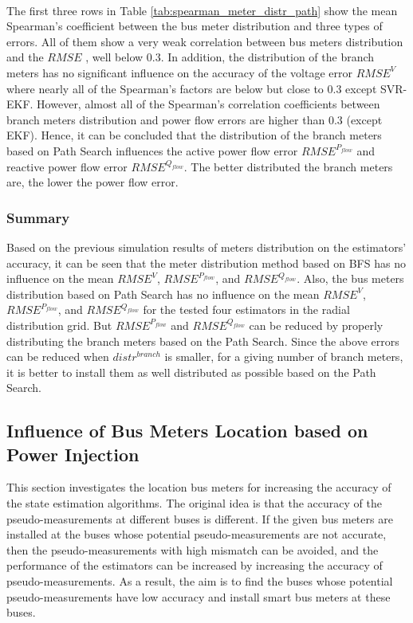 \bigskip
\\The first three rows in Table \ref{tab:spearman_meter_distr_path} show the mean Spearman's coefficient between the bus meter distribution and three types of errors. All of them show a very weak correlation between bus meters distribution and the $RMSE$ , well below 0.3. In addition, the distribution of the branch meters has no significant influence on the accuracy of the voltage error $RMSE^V$ where nearly all of the Spearman's factors are below but close to 0.3 except SVR-EKF. However, almost all of the Spearman's correlation coefficients between branch meters distribution and power flow errors are higher than 0.3 (except EKF). Hence, it can be concluded that the distribution of the branch meters based on Path Search influences the active power flow error $RMSE^{P_{flow}}$ and reactive power flow error $RMSE^{Q_{flow}}$. The better distributed the branch meters are, the lower the power flow error.

\subsubsection{Summary}
Based on the previous simulation results of meters distribution on the estimators' accuracy, it can be seen that the meter distribution method based on BFS has no influence on the mean $RMSE^V$, $RMSE^{P_{flow}}$, and $RMSE^{Q_{flow}}$. Also, the bus meters distribution based on Path Search has no influence on the mean $RMSE^V$, $RMSE^{P_{flow}}$, and $RMSE^{Q_{flow}}$ for the tested four estimators in the radial distribution grid. But $RMSE^{P_{flow}}$ and $RMSE^{Q_{flow}}$ can be reduced by properly distributing the branch meters based on the Path Search. Since the above errors can be reduced when $distr^{branch}$ is smaller, for a giving number of branch meters, it is better to install them as well distributed as possible based on the Path Search.

\subsection{Influence of Bus Meters Location based on Power Injection}
This section investigates the location bus meters for increasing the accuracy of the state estimation algorithms. The original idea is that the accuracy of the pseudo-measurements at different buses is different. If the given bus meters are installed at the buses whose potential pseudo-measurements are not accurate, then the pseudo-measurements with high mismatch can be avoided, and the performance of the estimators can be increased by increasing the accuracy of pseudo-measurements. As a result, the aim is to find the buses whose potential pseudo-measurements have low accuracy and install smart bus meters at these buses.

